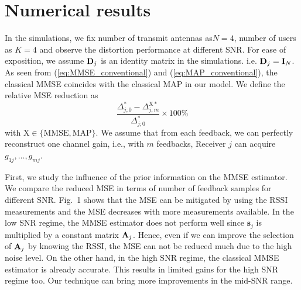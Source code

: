 \documentclass[francais]{gretsi}
\newtheorem{proposition}[theorem]{Proposition}
\begin{document}
%
\section{Numerical results}
\label{sec:num}
In the simulations, we fix number of transmit antennas as$N=4$, number of users as $K=4$ and observe the distortion performance at different SNR. For ease of exposition, we assume $\bold{D}_j$ is an identity matrix in the simulations. i.e. $\bold{D}_j=\bold{I}_N$. As seen from (\ref{eq:MMSE_conventional}) and (\ref{eq:MAP_conventional}), the classical MMSE coincides with the classical MAP in our model. We define the relative MSE reduction as \begin{equation}
\frac{\Delta_{j;0}^{*}-\Delta_{j;m}^{\mathrm{X}*}}{\Delta_{j;0}^{*}}\times 100\%
\end{equation}
 with $\text{X}\in\{\text{MMSE}, \text{MAP}\}$. We assume that from each feedback, we can perfectly reconstruct one channel gain, i.e., with $m$ feedbacks, Receiver $j$ can acquire $g_{1j},\dots,g_{mj}$.  
 
 First, we study the influence of the prior information on the MMSE estimator. We compare the reduced MSE in terms of number of feedback samples for different SNR. Fig.~1 shows that the MSE can be mitigated by using the RSSI measurements and the MSE decreases with more measurements available. In the low SNR regime, the MMSE estimator does not perform well since $\mathbf{s}_j$ is multiplied by a constant matrix $\bold{A}_j$. Hence, even if we can improve the selection of $\bold{A}_j$ by knowing the RSSI, the MSE can not be reduced much due to the high noise level. On the other hand, in the high SNR regime, the classical MMSE estimator is already accurate. This results in limited gains for the high SNR regime too. Our technique can bring more improvements in the mid-SNR range. 
 
\end{document}
